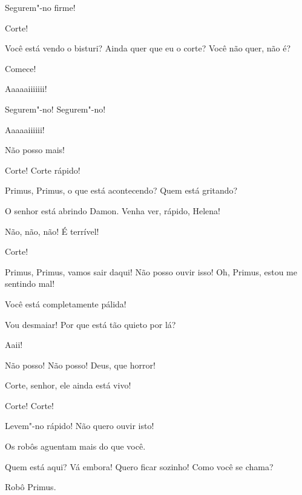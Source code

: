 
 Segurem"-no firme!

 Corte!


 Você está vendo o bisturi? Ainda quer que eu o corte? Você não
quer, não é?

 Comece!


 Aaaaaiiiiiii!

 Segurem"-no! Segurem"-no!

 Aaaaaiiiiii!

 Não posso mais!

 Corte! Corte rápido!

 Primus, Primus, o que está acontecendo? Quem está gritando?

  O senhor está abrindo Damon.
Venha ver, rápido, Helena!

 Não, não, não!  É terrível!

 Corte!

 Primus, Primus, vamos sair daqui! Não posso ouvir isso! Oh, Primus,
estou me sentindo mal!

  Você está completamente pálida!

 Vou desmaiar! Por que está tão quieto por lá?

 Aaii!

  Não
posso! Não posso! Deus, que horror!

  Corte, senhor, ele ainda está
vivo!

 Corte! Corte!

 Levem"-no rápido! Não quero ouvir isto!

 Os robôs aguentam mais do que você. 

 Quem está aqui? Vá embora! Quero ficar sozinho! Como você se
chama?

 Robô Primus.

